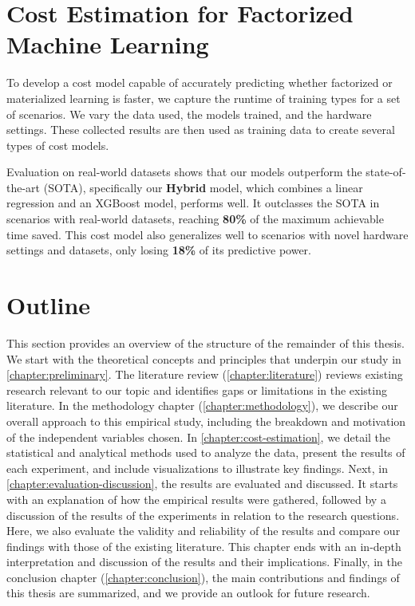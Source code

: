 \section{Cost Estimation for Factorized Machine Learning}
To develop a cost model capable of accurately predicting whether factorized or materialized learning is faster, we capture the runtime of training types for a set of scenarios. We vary the data used, the models trained, and the hardware settings. These collected results are then used as training data to create several types of cost models.

Evaluation on real-world datasets shows that our models outperform the state-of-the-art (SOTA), specifically our \textbf{Hybrid} model, which combines a linear regression and an XGBoost model, performs well. It outclasses the SOTA in scenarios with real-world datasets, reaching \textbf{80\%} of the maximum achievable time saved. This cost model also generalizes well to scenarios with novel hardware settings and datasets, only losing \textbf{18\%} of its predictive power.

\section{Outline}
This section provides an overview of the structure of the remainder of this thesis. We start with the theoretical concepts and principles that underpin our study in \autoref{chapter:preliminary}. The literature review (\autoref{chapter:literature}) reviews existing research relevant to our topic and identifies gaps or limitations in the existing literature. In the methodology chapter (\autoref{chapter:methodology}), we describe our overall approach to this empirical study, including the breakdown and motivation of the independent variables chosen.  In \autoref{chapter:cost-estimation}, we detail the statistical and analytical methods used to analyze the data, present the results of each experiment, and include visualizations to illustrate key findings. Next, in \autoref{chapter:evaluation-discussion}, the results are evaluated and discussed. It starts with an explanation of how the empirical results were gathered, followed by a discussion of the results of the experiments in relation to the research questions. Here, we also evaluate the validity and reliability of the results and compare our findings with those of the existing literature. This chapter ends with an in-depth interpretation and discussion of the results and their implications.  Finally, in the conclusion chapter (\autoref{chapter:conclusion}), the main contributions and findings of this thesis are summarized, and we provide an outlook for future research.

